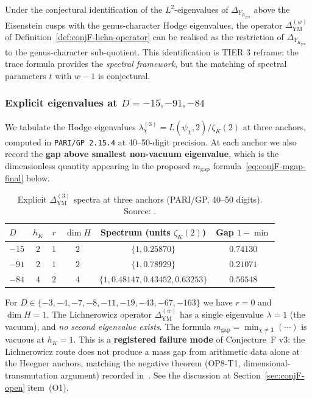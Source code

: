 \begin{corollary}\label{cor:conjF-Selberg-Lich}
Under the conjectural identification of the $L^2$-eigenvalues of
$\Delta_{Y_{K_{\mathrm{gen}}}}$ above the Eisenstein cusps with the
genus-character Hodge eigenvalues, the operator
$\Delta_{\mathrm{YM}}^{(w)}$ of
Definition~\ref{def:conjF-lichn-operator} can be realised as the
restriction of $\Delta_{Y_{K_{\mathrm{gen}}}}$ to the genus-character
sub-quotient.  This identification is TIER 3 reframe: the trace
formula provides the {\em spectral framework}, but the matching of
spectral parameters $t$ with $w - 1$ is conjectural.
\end{corollary}

\subsubsection{Explicit eigenvalues at $D = -15, -91, -84$}
\label{sec:conjF-num-eigs}

We tabulate the Hodge eigenvalues $\lambda_\chi^{(3)} =
L(\psi_\chi, 2) / \zeta_K(2)$ at three anchors, computed in
\texttt{PARI/GP 2.15.4} at 40--50-digit precision.  At each anchor we
also record the {\bf gap above smallest non-vacuum eigenvalue}, which
is the dimensionless quantity appearing in the proposed
$m_{\mathrm{gap}}$ formula~\eqref{eq:conjF-mgap-final} below.

\begin{table}[h!]
\caption{Explicit $\Delta_{\mathrm{YM}}^{(3)}$ spectra at three
anchors (PARI/GP, 40--50 digits).  Source:
\cite[\S4.5]{LichnerowiczSpectrum2026}.}
\label{tab:conjF-lich-spectra}
\centering
\begin{tabular}{lccccc}
\toprule
$D$ & $h_K$ & $r$ & $\dim H$ & Spectrum (units $\zeta_K(2)$) & Gap $1 - \min$\\
\midrule
$-15$  & $2$ & $1$ & $2$ & $\{1, 0.25870\}$ & $0.74130$ \\
$-91$  & $2$ & $1$ & $2$ & $\{1, 0.78929\}$ & $0.21071$ \\
$-84$  & $4$ & $2$ & $4$ & $\{1, 0.48147, 0.43452, 0.63253\}$ & $0.56548$ \\
\bottomrule
\end{tabular}
\end{table}

\begin{remark}[The $h_K = 1$ failure mode]\label{rk:conjF-hK1}
For $D \in \{-3, -4, -7, -8, -11, -19, -43, -67, -163\}$ we have
$r = 0$ and $\dim H = 1$.  The Lichnerowicz operator
$\Delta_{\mathrm{YM}}^{(w)}$ has a single eigenvalue $\lambda = 1$
(the vacuum), and {\em no second eigenvalue exists}.  The formula
$m_{\mathrm{gap}} = \min_{\chi \ne \mathbf{1}}(\cdots)$ is vacuous at
$h_K = 1$.  This is a {\bf registered failure mode} of Conjecture~F
v3: the Lichnerowicz route does not produce a mass gap from
arithmetic data alone at the Heegner anchors, matching the negative
theorem (OP8-T1, dimensional-transmutation argument) recorded
in~\cite{NoArithmeticMgap2026}.  See the discussion at
Section~\ref{sec:conjF-open} item~(O1).
\end{remark}

